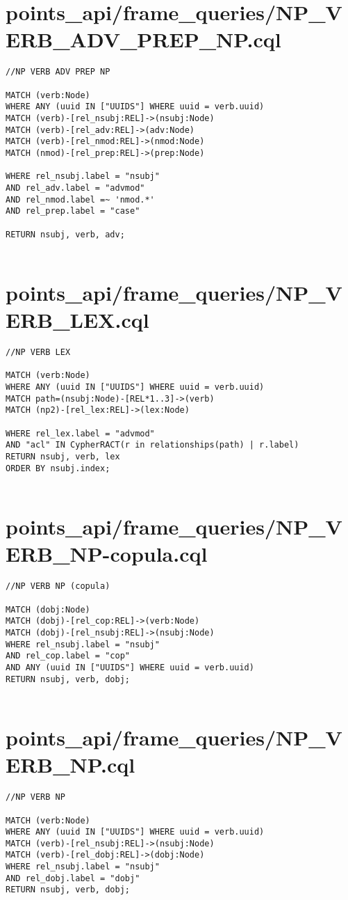 \documentclass{article}
\begin{document}
\section*{points\_api/frame\_queries/NP\_VERB\_ADV\_PREP\_NP.cql}
\begin{verbatim}
//NP VERB ADV PREP NP

MATCH (verb:Node)
WHERE ANY (uuid IN ["UUIDS"] WHERE uuid = verb.uuid)
MATCH (verb)-[rel_nsubj:REL]->(nsubj:Node)
MATCH (verb)-[rel_adv:REL]->(adv:Node)
MATCH (verb)-[rel_nmod:REL]->(nmod:Node)
MATCH (nmod)-[rel_prep:REL]->(prep:Node)

WHERE rel_nsubj.label = "nsubj"
AND rel_adv.label = "advmod"
AND rel_nmod.label =~ 'nmod.*'
AND rel_prep.label = "case"

RETURN nsubj, verb, adv;


\end{verbatim}
\pagebreak

\section*{points\_api/frame\_queries/NP\_VERB\_LEX.cql}
\begin{verbatim}
//NP VERB LEX

MATCH (verb:Node)
WHERE ANY (uuid IN ["UUIDS"] WHERE uuid = verb.uuid)
MATCH path=(nsubj:Node)-[REL*1..3]->(verb)
MATCH (np2)-[rel_lex:REL]->(lex:Node)

WHERE rel_lex.label = "advmod"
AND "acl" IN CypherRACT(r in relationships(path) | r.label)
RETURN nsubj, verb, lex
ORDER BY nsubj.index;


\end{verbatim}
\pagebreak

\section*{points\_api/frame\_queries/NP\_VERB\_NP-copula.cql}
\begin{verbatim}
//NP VERB NP (copula)

MATCH (dobj:Node)
MATCH (dobj)-[rel_cop:REL]->(verb:Node)
MATCH (dobj)-[rel_nsubj:REL]->(nsubj:Node)
WHERE rel_nsubj.label = "nsubj"
AND rel_cop.label = "cop"
AND ANY (uuid IN ["UUIDS"] WHERE uuid = verb.uuid)
RETURN nsubj, verb, dobj;


\end{verbatim}
\pagebreak

\section*{points\_api/frame\_queries/NP\_VERB\_NP.cql}
\begin{verbatim}
//NP VERB NP

MATCH (verb:Node)
WHERE ANY (uuid IN ["UUIDS"] WHERE uuid = verb.uuid)
MATCH (verb)-[rel_nsubj:REL]->(nsubj:Node)
MATCH (verb)-[rel_dobj:REL]->(dobj:Node)
WHERE rel_nsubj.label = "nsubj"
AND rel_dobj.label = "dobj"
RETURN nsubj, verb, dobj;


\end{verbatim}
\pagebreak
\end{document}
